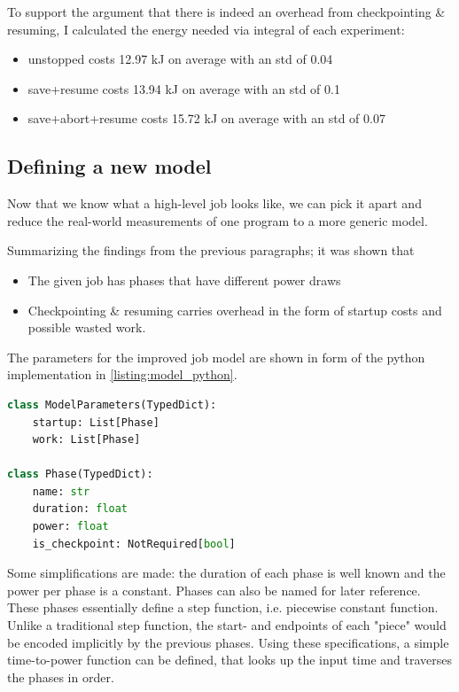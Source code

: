 To support the argument that there is indeed an overhead from checkpointing \& resuming, I calculated the energy needed via integral of each experiment:

\begin{itemize}
    \item  unstopped costs 12.97 kJ on average with an std of 0.04
    \item  save+resume costs 13.94 kJ on average with an std of 0.1
    \item  save+abort+resume costs 15.72 kJ on average with an std of 0.07
\end{itemize}

\subsection{Defining a new model}

Now that we know what a high-level job looks like, we can pick it apart and reduce the real-world measurements of one program to a more generic model. 

Summarizing the findings from the previous paragraphs; it was shown that 

\begin{itemize}
    \item The given job has phases that have different power draws
    \item Checkpointing \& resuming carries overhead in the form of startup costs and possible wasted work.
\end{itemize}

The parameters for the improved job model are shown in form of the python implementation in \ref{listing:model_python}. 

\begin{lstlisting}[language=python, frame=single, numbers=none, caption={Python Model definition}, basicstyle=\ttfamily, label={listing:model_python}]
class ModelParameters(TypedDict):
    startup: List[Phase]
    work: List[Phase]
    
class Phase(TypedDict):
    name: str
    duration: float
    power: float
    is_checkpoint: NotRequired[bool]   
\end{lstlisting}

Some simplifications are made: the duration of each phase is well known and the power per phase is a constant. 
Phases can also be named for later reference.
These phases essentially define a step function, i.e. piecewise constant function.
Unlike a traditional step function, the start- and endpoints of each "piece" would be encoded implicitly by the previous phases.
Using these specifications, a simple time-to-power function can be defined, that looks up the input time and traverses the phases in order.

